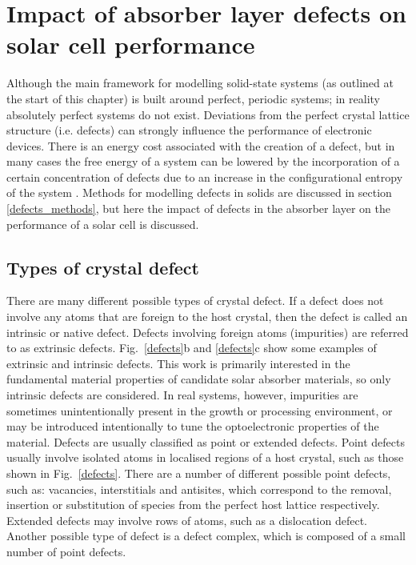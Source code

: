 \documentclass[11pt, twoside]{report}
\begin{document}
\section{Impact of absorber layer defects on solar cell performance}\label{defects_impact}
Although the main framework for modelling solid-state systems (as outlined at the start of this chapter) is built around perfect, periodic systems; in reality absolutely perfect systems do not exist. Deviations from the perfect crystal lattice structure (i.e. defects) can strongly influence the performance of electronic devices. There is an energy cost associated with the creation of a defect, but in many cases the free energy of a system can be lowered by the incorporation of a certain concentration of defects due to an increase in the configurational entropy of the system \cite{AshcroftMermin_general}. Methods for modelling defects in solids are discussed in section \ref{defects_methods}, but here the impact of defects in the absorber layer on the performance of a solar cell is discussed.

\subsection{Types of crystal defect}

There are many different possible types of crystal defect. If a defect does not involve any atoms that are foreign to the host crystal, then the defect is called an intrinsic or native defect. Defects involving foreign atoms (impurities) are referred to as extrinsic defects. Fig.~\ref{defects}b and \ref{defects}c show some examples of extrinsic and intrinsic defects. This work is primarily interested in the fundamental material properties of candidate solar absorber materials, so only intrinsic defects are considered. In real systems, however, impurities are sometimes unintentionally present in the growth or processing environment, or may be introduced intentionally to tune the optoelectronic properties of the material.
Defects are usually classified as point or extended defects. Point defects usually involve isolated atoms in localised regions of a host crystal, such as those shown in Fig.~\ref{defects}. There are a number of different possible point defects, such as: vacancies, interstitials and antisites, which correspond to the removal, insertion or substitution of species from the perfect host lattice respectively. Extended defects may involve rows of atoms, such as a dislocation defect. Another possible type of defect is a defect complex, which is composed of a small number of point defects.
\end{document}
